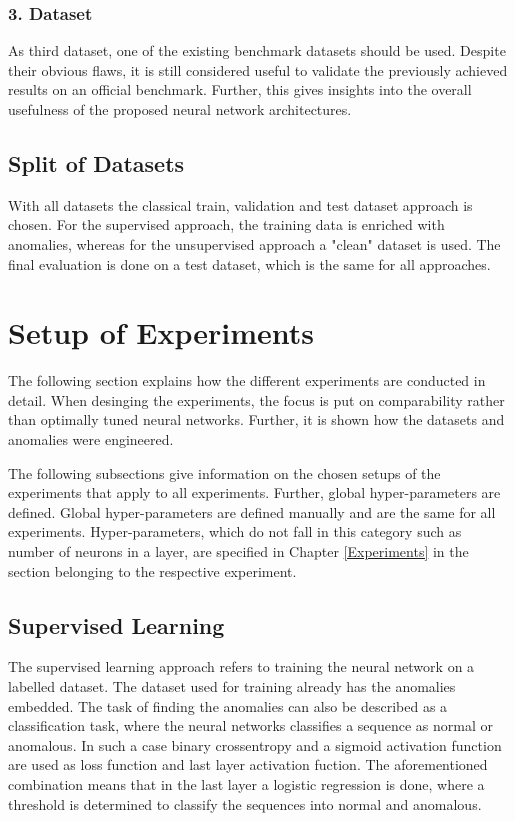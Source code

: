 \subsubsection{3. Dataset}
As third dataset, one of the existing benchmark datasets should be used. Despite their obvious flaws, it is still considered useful to validate the previously achieved results on an official benchmark. Further, this gives insights into the overall usefulness of the proposed neural network architectures.

\subsection{Split of Datasets}
With all datasets the classical train, validation and test dataset approach is chosen. For the supervised approach, the training data is enriched with anomalies, whereas for the unsupervised approach a "clean" dataset is used. The final evaluation is done on a test dataset, which is the same for all approaches.


\section{Setup of Experiments} \label{SetupOfExperiments}
The following section explains how the different experiments are conducted in detail. When desinging the experiments, the focus is put on comparability rather than optimally tuned neural networks.  Further, it is shown how the datasets and anomalies were engineered.

The following subsections give information on the chosen setups of the experiments that apply to all experiments. Further, global hyper-parameters are defined. Global hyper-parameters are defined manually and are the same for all experiments. Hyper-parameters, which do not fall in this category such as number of neurons in a layer, are specified in Chapter \ref{Experiments} in the section belonging to the respective experiment.

\subsection{Supervised Learning}
The supervised learning approach refers to training the neural network on a labelled dataset. The dataset used for training already has the anomalies embedded. The task of finding the anomalies can also be described as a classification task, where the neural networks classifies a sequence as normal or anomalous. In such a case binary crossentropy and a sigmoid activation function are used as loss function and last layer activation fuction. The aforementioned combination means that in the last layer a logistic regression is done, where a threshold is determined to classify the sequences into normal and anomalous.

